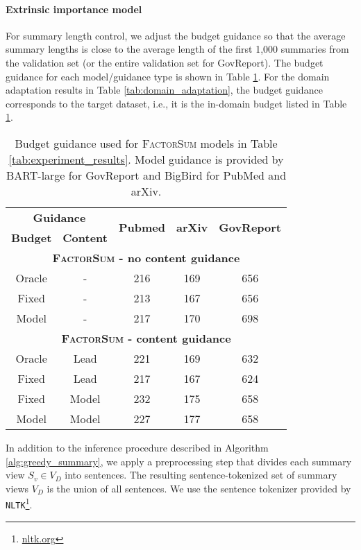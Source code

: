 \documentclass[11pt,table]{article}
\newcommand{\modelname}{FactorSum}
\begin{document}
\paragraph{Extrinsic importance model}
For summary length control, we adjust the budget guidance so that the average summary lengths is close to the average length of the first 1,000 summaries from the validation set (or the entire validation set for GovReport). The budget guidance for each model/guidance type is shown in Table \ref{tab:budget_guidance}. For the domain adaptation results in Table \ref{tab:domain_adaptation}, the budget guidance corresponds to the target dataset, i.e., it is the in-domain budget listed in Table \ref{tab:budget_guidance}.

\begin{table}
  \centering
  \setlength\tabcolsep{2.2pt}
  \begin{tabular}{cc|c|c|c}
    \toprule
    \multicolumn{2}{c|}{\textbf{Guidance}} & \multirow{2}{1.4cm}{\centering \textbf{Pubmed}} & \multirow{2}{1.cm}{\centering \textbf{arXiv}} & \multirow{2}{1.9cm}{\centering \textbf{GovReport}} \\
    \textbf{Budget} & \textbf{Content} & \, & \\
    \toprule
    \multicolumn{5}{c}{\textbf{\textsc{\modelname} - no content guidance}} \\
    \midrule
    Oracle & - & 216 & 169 & 656 \\
    Fixed & - & 213 & 167 & 656 \\
    Model & - & 217 & 170 & 698 \\
    \midrule
    \multicolumn{5}{c}{\textbf{\textsc{\modelname} - content guidance}} \\
    \midrule
    Oracle & Lead & 221 & 169 & 632 \\
    Fixed & Lead & 217 & 167 & 624 \\
    Fixed & Model & 232 & 175 & 658 \\
    Model & Model & 227 & 177 & 658 \\
    \bottomrule
  \end{tabular}
  \caption{Budget guidance used for \textsc{\modelname} models in Table \ref{tab:experiment_results}. Model guidance is provided by BART-large for GovReport and BigBird for PubMed and arXiv.}\label{tab:budget_guidance}
\end{table}

In addition to the inference procedure described in Algorithm \ref{alg:greedy_summary}, we apply a preprocessing step that divides each summary view $S_v \in V_D$ into sentences. The resulting sentence-tokenized set of summary views $V_D$ is the union of all sentences. We use the sentence tokenizer provided by \texttt{NLTK}\footnote{\url{nltk.org}}. 
\end{document}
